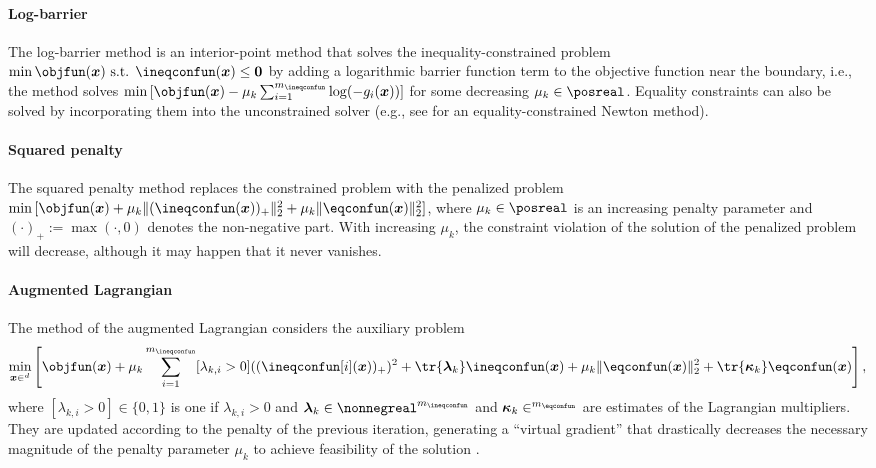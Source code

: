 \paragraph{Log-barrier}

The log-barrier method
is an interior-point method that solves the inequality-constrained problem
$\min \objfun(\*x) \text{ s.t. } \ineqconfun(\*x) \le \*0$ by
adding a logarithmic barrier function term to the objective function
near the boundary, i.e., the method solves
$\min\, [\objfun(\*x) - \mu_k \sum_{i=1}^{m_{\ineqconfun}} \log(-g_i(\*x))]$
for some decreasing $\mu_k \in \posreal$.
Equality constraints can also be solved by incorporating them
into the unconstrained solver (e.g., see \cite{Boyd04Convex}
for an equality-constrained Newton method).

\paragraph{Squared penalty}

The squared penalty method
replaces the constrained problem with the penalized problem
$\min\, [\objfun(\*x) + \mu_k \norm[2]{(\ineqconfun(\*x))_{+}}^2 +
\mu_k \norm[2]{\eqconfun(\*x)}^2]$,
where $\mu_k \in \posreal$ is an increasing penalty parameter and
$(\cdot)_{+} := \max(\cdot, 0)$ denotes the non-negative part.
With increasing $\mu_k$, the constraint violation of the solution of
the penalized problem will decrease, although it may happen
that it never vanishes.

\paragraph{Augmented Lagrangian}

The method of the augmented Lagrangian
considers the auxiliary problem
\begin{equation}
  \min_{\*x \in \real^d} \left[
    \objfun(\*x) + \mu_k \sum_{i=1}^{m_{\ineqconfun}} [\lambda_{k,i} > 0]
    ((\ineqconfun[i](\*x))_{+})^2 + \tr{\*\lambda_k} \ineqconfun(\*x) +
    \mu_k \norm[2]{\eqconfun(\*x)}^2 +
    \tr{\*\kappa_k} \eqconfun(\*x)
  \right],
\end{equation}
where $[\lambda_{k,i} > 0] \in \{0, 1\}$ is one if $\lambda_{k,i} > 0$ and
$\*\lambda_k \in \nonnegreal^{m_{\ineqconfun}}$ and
$\*\kappa_k \in \real^{m_{\eqconfun}}$ are estimates of the
Lagrangian multipliers.
They are updated according to the penalty of the previous iteration,
generating a ``virtual gradient'' that drastically decreases
the necessary magnitude of the penalty parameter $\mu_k$
to achieve feasibility of the solution \cite{Toussaint15Introduction}.

